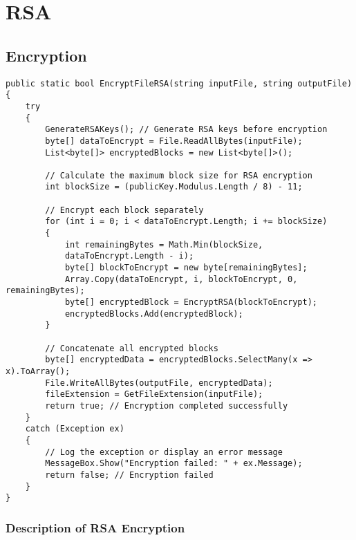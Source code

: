 \documentclass[a4paper,oneside,11pt]{book}
\begin{document}
\MakeTitle 
{} 
\tableofcontents
\pagestyle{plain}
\cleardoublepage 
{} 


\chapter[RSA]{RSA}
\section{Encryption}
\begin{lstlisting}[language=Csh, caption={Code for RSA Encryption}]
public static bool EncryptFileRSA(string inputFile, string outputFile)
{
    try
    {
        GenerateRSAKeys(); // Generate RSA keys before encryption
        byte[] dataToEncrypt = File.ReadAllBytes(inputFile);
        List<byte[]> encryptedBlocks = new List<byte[]>();
    
        // Calculate the maximum block size for RSA encryption
        int blockSize = (publicKey.Modulus.Length / 8) - 11; 
    
        // Encrypt each block separately
        for (int i = 0; i < dataToEncrypt.Length; i += blockSize)
        {
            int remainingBytes = Math.Min(blockSize, 
            dataToEncrypt.Length - i);
            byte[] blockToEncrypt = new byte[remainingBytes];
            Array.Copy(dataToEncrypt, i, blockToEncrypt, 0, remainingBytes);    
            byte[] encryptedBlock = EncryptRSA(blockToEncrypt);
            encryptedBlocks.Add(encryptedBlock);
        }
    
        // Concatenate all encrypted blocks
        byte[] encryptedData = encryptedBlocks.SelectMany(x => x).ToArray();
        File.WriteAllBytes(outputFile, encryptedData);
        fileExtension = GetFileExtension(inputFile);
        return true; // Encryption completed successfully
    }
    catch (Exception ex)
    {
        // Log the exception or display an error message
        MessageBox.Show("Encryption failed: " + ex.Message);
        return false; // Encryption failed
    }
}
\end{lstlisting}

\subsection{Description of RSA Encryption}
\end{document}
